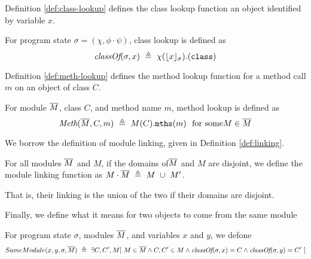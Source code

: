 Definition \ref{def:class-lookup} defines the class lookup function an object 
identified by variable $x$.
\begin{definition}
\label{def:class-lookup}
For program state $\sigma = (\chi, \phi \cdot\psi)$, class lookup is defined as 
$$\class{\sigma}{x}\ \triangleq\ \chi(\interpret{\sigma}{x}).(\prg{class})$$
\end{definition}

Definition \ref{def:meth-lookup} defines the method lookup function for a method
call $m$ on an object of class $C$.
\begin{definition}
\label{def:meth-lookup}
For module $\overline{M}$, class $C$, and method name $m$, method lookup is defined as 
$$\meth{\Mtwo}{C}{m}\ \triangleq\ M(C).\prg{mths}(m)\ \ \mbox{for some} M\in\Mtwo$$
\end{definition}

We borrow the definition  of module linking, given in Definition \ref{def:linking}.
\begin{definition}
\label{def:linking}
For all modules $\overline{M}$ and $M$, if the domains of$\overline{M}$ and $M$ are disjoint, 
we define the module linking function as $M\cdot \overline{M}\ \triangleq\ M\ \cup\ M'$.
\end{definition}
That is,  their linking is the union of the two if their domains are disjoint.


\newcommand{\Same}[4]{{SameModule(#1,#2,#3,#4)}}

Finally, we define what it means for two objects to come from the same module
\begin{definition}
\label{def:class-lookup}
For program state $\sigma$,  modules $\overline{M}$, and variables $x$ and $y$, we defone
$$\Same {x} {y} {\sigma}{\Mtwo}\ \triangleq\ \exists C, C', M[ \ M\in \Mtwo \wedge C, C'\in M \wedge  \class{\sigma}{x}=C \wedge \class{\sigma}{y} =C'\ ]$$
\end{definition}


